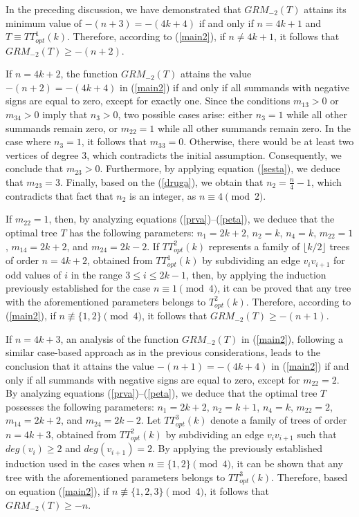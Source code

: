 \documentclass[preprint,12pt]{elsarticle}
\begin{document}
\bigskip


In the preceding discussion, we have demonstrated that $GRM_{-2}(T)$ attains its minimum value of $-(n+3) = -(4k+4)$ if and only if $n = 4k + 1$ and $T \equiv TT^1_{opt}(k)$.
Therefore, according to (\ref{main2}), if $n \neq 4k + 1$, it follows that $GRM_{-2}(T) \geq -(n+2)$.

If $n=4k+2$, the function $GRM_{-2}(T)$ attains the value $-(n+2)=-(4k+4)$ in (\ref{main2}) if and only if all summands with negative signs are equal to zero, except for exactly one.
Since the conditions $m_{13}>0$ or $m_{34}>0$ imply that $n_3>0$, two possible cases arise: either $n_3=1$ while all other summands remain zero, or $m_{22}=1$ while all other summands remain zero.
In the case where $n_3=1$, it follows that $m_{33}=0$. Otherwise, there would be at least two vertices of degree 3, which contradicts the initial assumption. Consequently, we conclude that $m_{23}>0$. Furthermore, by applying equation (\ref{sesta}), we deduce that $m_{23}=3$. Finally, based on the (\ref{druga}), we obtain that $n_2=\frac{n}{4}-1$, which contradicts that fact that $n_2$ is an integer, as $n\equiv 4\pmod 2$.

If $m_{22}=1$, then, by analyzing equations (\ref{prva})–(\ref{peta}), we deduce that the optimal tree $T$ has the following parameters: $n_1=2k+2$, $n_2=k$, $n_4=k$, $m_{22}=1$, $m_{14}=2k+2$, and $m_{24}=2k-2$.
If $TT^2_{opt} (k)$ represents a family of $\lfloor k / 2 \rfloor$ trees of order $n = 4k+2$, obtained from $TT^{1}_{opt} (k)$ by subdividing an edge $v_i v_{i+1}$ for odd values of $i$ in the range $3 \leq i \leq 2k-1$, then, by applying the induction previously established for the case $n \equiv 1 \pmod{4}$, it can be proved that any tree with the aforementioned parameters belongs to $T^2_{opt} (k)$.
Therefore, according to (\ref{main2}), if $n \not\equiv  \{1,2\}\pmod 4$, it follows that $GRM_{-2}(T) \geq -(n+1)$.

\bigskip

If $n=4k+3$, an analysis of the function $GRM_{-2}(T)$ in (\ref{main2}), following a similar case-based approach as in the previous considerations, leads to the conclusion that it attains the value $-(n+1)=-(4k+4)$ in (\ref{main2}) if and only if all summands with negative signs are equal to zero, except for $m_{22}=2$.
By analyzing equations (\ref{prva})–(\ref{peta}), we deduce that the optimal tree $T$ possesses the following parameters: $n_1=2k+2$, $n_2=k+1$, $n_4=k$, $m_{22}=2$, $m_{14}=2k+2$, and $m_{24}=2k-2$.
Let $TT^3_{opt}(k)$ denote a family of trees of order $n = 4k + 3$, obtained from $TT^2_{opt}(k)$  by subdividing an edge $v_i v_{i+1}$ such that $deg(v_i) \geq 2$ and $deg(v_{i+1}) = 2$.
By applying the previously established induction used in the cases when $n \equiv \{1,2\} \pmod{4}$, it can be shown that any tree with the aforementioned parameters belongs to $TT^3_{opt}(k)$.
Therefore, based on equation (\ref{main2}), if $n \not\equiv \{1, 2, 3\} \pmod{4}$, it follows that $GRM_{-2}(T) \geq -n$.
\end{document}
